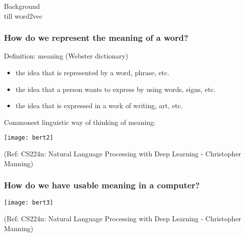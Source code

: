 \begin{frame}[fragile]\frametitle{}
\begin{center}
{\Large Background}\\

{till word2vec}

\end{center}
\end{frame}



\begin{frame}[fragile]\frametitle{How do we represent the meaning of a word?}
Definition: meaning (Webster dictionary)

\begin{itemize}
\item the idea that is represented by a word, phrase, etc.
\item the idea that a person wants to express by using  words, signs, etc.
\item the idea that is expressed in a work of writing, art, etc.  
\end{itemize}

Commonest linguistic way of thinking of meaning:

\begin{center}
\texttt{[image: bert2]}
\end{center}		  

{\tiny (Ref: CS224n: Natural Language Processing with Deep Learning - Christopher Manning)}

\end{frame}


\begin{frame}[fragile]\frametitle{How do we have usable meaning in a computer?}


\begin{center}
\texttt{[image: bert3]}
\end{center}		  

{\tiny (Ref: CS224n: Natural Language Processing with Deep Learning - Christopher Manning)}

\end{frame}


